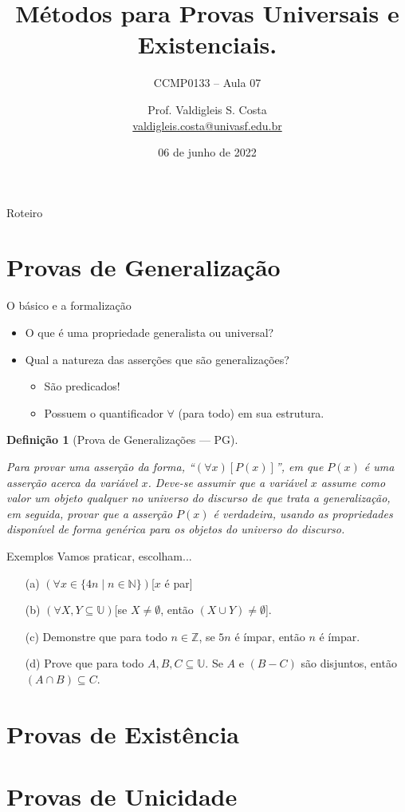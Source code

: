 \documentclass[aspectratio=169]{beamer}
\title{Métodos para Provas Universais e Existenciais.}
\subtitle{CCMP0133 -- Aula 07}
\date{06 de junho de 2022}
\author{Prof. Valdigleis S. Costa\\\url{valdigleis.costa@univasf.edu.br}}
\institute{Universidade Federal do Vale do São Francisco\\Colegiado de Ciência da Computação\\\textit{Campus} Salgueiro-PE}
\newtheorem{defi}{Definição}
\begin{document}
	\maketitle
	
	\begin{frame}{Roteiro}
		\tableofcontents
	\end{frame}

	\section{Provas de Generalização}
	
	\begin{frame}{O básico e a formalização}
		\begin{itemize}
			\item O que é uma propriedade generalista ou universal?\pause
			\item Qual a natureza das asserções que são generalizações?\pause
			\begin{itemize}
				\item São predicados!
				\item Possuem o quantificador $\forall$ (para todo) em sua estrutura.
			\end{itemize} 
		\end{itemize}
		\pause
		\begin{defi}[Prova de Generalizações --- PG]
			\
			
			Para provar uma asserção da forma, ``$(\forall x)[P(x)]$'', em que $P(x)$ é uma asserção acerca da variável $x$. Deve-se assumir que a variável $x$ assume como valor um objeto qualquer no universo do discurso de que trata a  generalização, em seguida, provar que a asserção $P(x)$ é verdadeira, usando as propriedades disponível de forma genérica para os objetos do universo do discurso.
		\end{defi}
	\end{frame}

	\begin{frame}{Exemplos}
		Vamos praticar, escolham...
		\begin{itemize}
			\item[(a)] $(\forall x \in \{4n \mid n \in \mathbb{N} \})$[$x$ é par]
			\item[(b)] $(\forall X, Y \subseteq \mathbb{U})$[se $X \neq \emptyset$, então $(X \cup Y) \neq \emptyset$].
			\item[(c)] Demonstre que para todo $n \in \mathbb{Z}$, se $5n$ é ímpar, então $n$ é ímpar.
			\item[(d)] Prove que para todo $A, B, C  \subseteq \mathbb{U}$. Se $A$ e $(B - C)$ são disjuntos, então $(A \cap B) \subseteq C$.
		\end{itemize}
	\end{frame}


	\section{Provas de Existência}
	\section{Provas de Unicidade}
	
\end{document}
